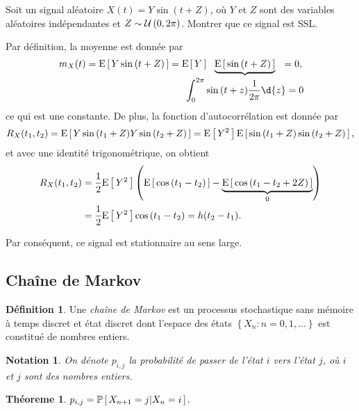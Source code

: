 \documentclass[11pt]{article}
\makeatletter
\newcommand\Pg[2]{%
	\ensuremath{%
		\mathbb{P}\left[\,#1\middle\rvert#2\,\right]%
	}%
}%
\newcommand\Uni[2]{%
	\ensuremath{%
		\mathcal{U}\left(#1,#2\right)%
	}%
}%
\newcommand\Esp[1]{%
	\ensuremath{%
		\mathrm{E}\left[\,#1\,\right]%
	}%
}%
\newtheorem{theoreme}{Théoreme}[section]
\newtheorem*{notation}{Notation}
\theoremstyle{remark}
\theoremstyle{definition}
\newtheorem*{@definition}{Définition}
\newenvironment{definition}{%
	\begin{@definition}%
}{%
	\end{@definition}%
	\setcounter{property}{0}%
}
\makeatother
\begin{document}
\begin{exemple}
	Soit un signal aléatoire $X(t)=Y\sin{(t+Z)}$, où $Y$ et $Z$ sont des
	variables aléatoires indépendantes et $Z\sim\Uni{0}{2\pi}$. Montrer que ce
	signal est SSL.

	Par définition, la moyenne est donnée par
	\begin{equation*}
		m_X(t)
		=\Esp{Y\sin{(t+Z)}}
		=\Esp{Y}\hspace{-8mm}\underbrace{\Esp{\sin{(t+Z)}}}_{\displaystyle
			\int_0^{2\pi}\sin{(t+z)}\frac{1}{2\pi}\d{z}=0}\hspace{-8mm}
		=0,
	\end{equation*}
	ce qui est une constante. De plus, la fonction d'autocorrélation est donnée
	par
	\begin{equation*}
		R_X(t_1,t_2)
		=\Esp{Y\sin{(t_1+Z)}Y\sin{(t_2+Z)}}
		=\Esp{Y^2}\Esp{\sin{(t_1+Z)}\sin{(t_2+Z)}},
	\end{equation*}
	et avec une identité trigonométrique, on obtient
	\begin{equation*}
		\begin{split}
			R_X(t_1,t_2)
			&=\frac{1}{2}\Esp{Y^2}\left(
				\Esp{\cos{(t_1-t_2)}}-\underbrace{\Esp{\cos{(t_1-t_2+2Z)}}}_0
			\right)\\
			&=\frac{1}{2}\Esp{Y^2}\cos{(t_1-t_2)}
			=h(t_2-t_1).
		\end{split}
	\end{equation*}

	Par conséquent, ce signal est stationnaire au sens large.
\end{exemple}

\subsection{Chaîne de Markov}
\begin{definition}
	Une \textit{chaîne de Markov} est un processus stochastique sans mémoire à
	temps discret et état discret dont l'espace des états $\left\{X_n:n=0,1,
	\dots\right\}$ est constitué de nombres entiers.
\end{definition}

\begin{notation}
	On dénote $p_{i,j}$ la probabilité de passer de l'état $i$ vers l'état $j$,
	où $i$ et $j$ sont des nombres entiers.
\end{notation}

\begin{theoreme}
	$p_{i,j}=\Pg{X_{n+1}=j}{X_n=i}$.
\end{theoreme}
\end{document}
